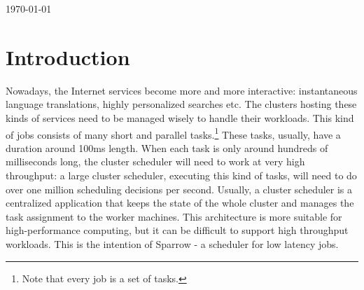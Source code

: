 \documentclass[11pt]{article}
\begin{document}
\begin{titlepage}


{\large \today}\\[2cm] %


 

\vfill %

\end{titlepage}


\section{Introduction}

	Nowadays, the Internet services become more and more interactive: instantaneous language translations, highly personalized searches etc. The clusters hosting these kinds of services need to be managed wisely to handle their workloads. This kind of jobs consists of many short and parallel tasks.\footnote{Note that every job is a set of tasks.} These tasks, usually, have a duration around 100ms length. When each task is only around hundreds of milliseconds long, the cluster scheduler will need to work at very high throughput: a large cluster scheduler, executing this kind of tasks, will need to do over one million scheduling decisions per second. Usually, a cluster scheduler is a centralized application that keeps the state of the whole cluster and manages the task assignment to the worker machines. This architecture is more suitable for high-performance computing, but it can be difficult to support high throughput workloads. This is the intention of Sparrow - a scheduler for low latency jobs.
\end{document}
